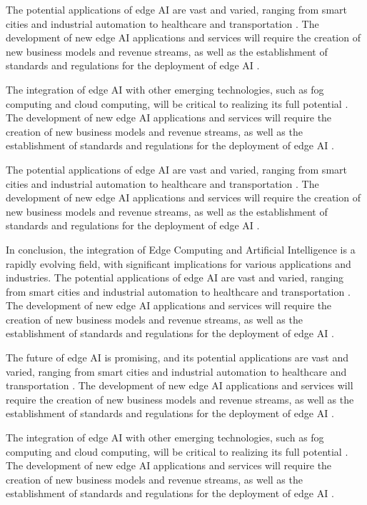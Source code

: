 \documentclass[11pt,a4paper]{article}
\begin{document}
The potential applications of edge AI are vast and varied, ranging from smart cities and industrial automation to healthcare and transportation \cite{arxiv:2201.00242}. The development of new edge AI applications and services will require the creation of new business models and revenue streams, as well as the establishment of standards and regulations for the deployment of edge AI \cite{arxiv:1909.08747}. 

The integration of edge AI with other emerging technologies, such as fog computing and cloud computing, will be critical to realizing its full potential \cite{arxiv:2111.10076}. The development of new edge AI applications and services will require the creation of new business models and revenue streams, as well as the establishment of standards and regulations for the deployment of edge AI \cite{arxiv:2106.10063}. 

The potential applications of edge AI are vast and varied, ranging from smart cities and industrial automation to healthcare and transportation \cite{arxiv:2101.10417}. The development of new edge AI applications and services will require the creation of new business models and revenue streams, as well as the establishment of standards and regulations for the deployment of edge AI \cite{arxiv:2105.03559}. 

In conclusion, the integration of Edge Computing and Artificial Intelligence is a rapidly evolving field, with significant implications for various applications and industries. The potential applications of edge AI are vast and varied, ranging from smart cities and industrial automation to healthcare and transportation \cite{arxiv:2206.07164}. The development of new edge AI applications and services will require the creation of new business models and revenue streams, as well as the establishment of standards and regulations for the deployment of edge AI \cite{arxiv:2305.01974}. 

The future of edge AI is promising, and its potential applications are vast and varied, ranging from smart cities and industrial automation to healthcare and transportation \cite{arxiv:2301.07803}. The development of new edge AI applications and services will require the creation of new business models and revenue streams, as well as the establishment of standards and regulations for the deployment of edge AI \cite{arxiv:2309.03420}. 

The integration of edge AI with other emerging technologies, such as fog computing and cloud computing, will be critical to realizing its full potential \cite{arxiv:2403.19729}. The development of new edge AI applications and services will require the creation of new business models and revenue streams, as well as the establishment of standards and regulations for the deployment of edge AI \cite{arxiv:2306.17170}. 
\end{document}
